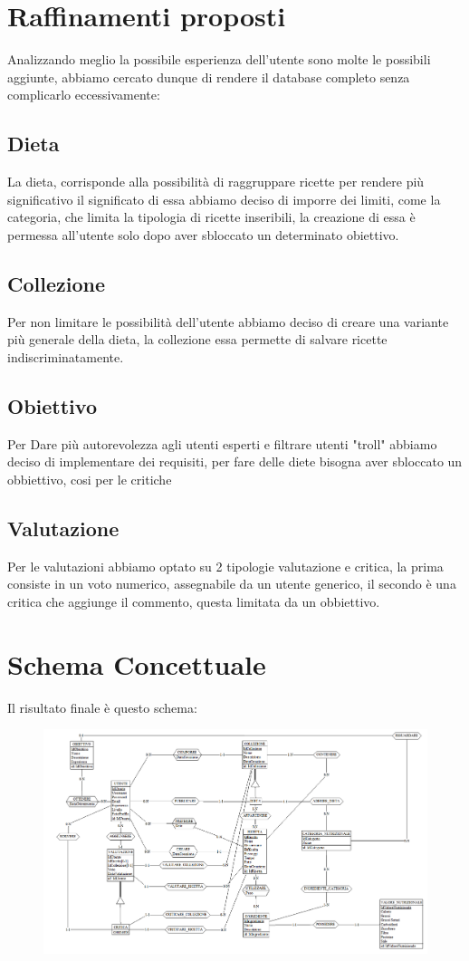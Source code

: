 ﻿\documentclass[a4paper,12pt]{report}
\begin{document}
\section{Raffinamenti proposti}
Analizzando meglio la possibile esperienza dell'utente
sono molte le possibili aggiunte, abbiamo cercato
dunque di rendere il database completo senza complicarlo eccessivamente:
\subsection{Dieta}
La dieta, corrisponde alla possibilità di raggruppare ricette
per rendere più significativo il significato di essa abbiamo deciso di 
imporre dei limiti, come la categoria, che limita la tipologia di ricette 
inseribili, la creazione di essa è permessa all'utente solo dopo aver sbloccato un determinato obiettivo.
\subsection{Collezione}
Per non limitare le possibilità dell'utente abbiamo deciso di creare 
una variante più generale della dieta, la collezione
essa permette di salvare ricette indiscriminatamente.
\subsection{Obiettivo}
Per Dare più autorevolezza agli utenti esperti e
filtrare utenti "troll" abbiamo deciso di implementare dei requisiti,
per fare delle diete bisogna aver sbloccato un obbiettivo, 
cosi per le critiche
\subsection{Valutazione}
Per le valutazioni abbiamo optato su 2 tipologie
valutazione e critica, la prima consiste in un voto
numerico, assegnabile da un utente generico, il secondo è una critica
che aggiunge il commento, questa limitata da un obbiettivo.\\
\section{Schema Concettuale}
Il risultato finale è questo schema:
\begin{figure}[H]
    \centering
    \includegraphics[width=1\linewidth]{app_images/schema-concettuale.png}
\end{figure}
\end{document}
